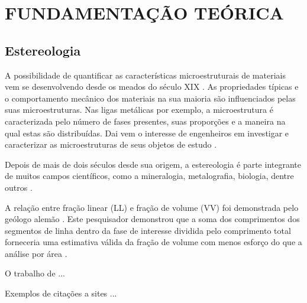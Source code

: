 \chapter{FUNDAMENTAÇÃO TEÓRICA}
\label{cap:fundamentacao}

\lipsum[5] %

\section{Estereologia} 

A possibilidade de quantificar as características microestruturais de materiais vem se desenvolvendo desde os meados do século XIX \cite{Friel2000, Mannheimer2002}. As propriedades típicas e o comportamento mecânico dos materiais na sua maioria são influenciados pelas suas microestruturas. Nas ligas metálicas por exemplo, a microestrutura é caracterizada pelo número de fases presentes, suas proporções e a maneira na qual estas são distribuídas. Dai vem o interesse de engenheiros em investigar e caracterizar as microestruturas de seus objetos de estudo \cite{Callister2012}.

\lipsum[6] %

Depois de mais de dois séculos desde sua origem, a estereologia é parte integrante de muitos campos científicos, como a mineralogia, metalografia, biologia, dentre outros \cite{Miyamoto1994, Russ1986, Friel2000, Baddeley2004, Mannheimer2002}.

 A relação entre fração linear (\gls{LL}) e fração de volume (\gls{VV}) foi demonstrada pelo geólogo alemão . Este pesquisador demonstrou que a soma dos comprimentos dos segmentos de linha dentro da fase de interesse dividida pelo comprimento total forneceria uma estimativa válida da fração de volume com menos esforço do que a análise por área \cite{Pabst2015, Baddeley2004,Friel2000, Russ1986}.
 
\lipsum[6] %
 
O trabalho de ...

Exemplos de citações a sites \cite{Benjamin2014, Plugins2018}...